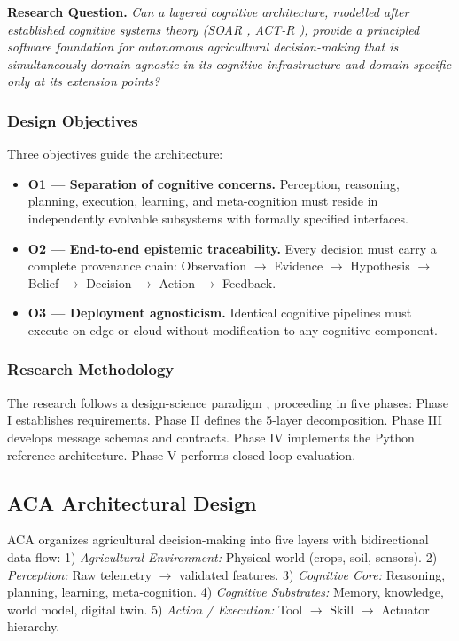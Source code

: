 \documentclass[journal, twocolumn]{IEEEtran}
\begin{document}
\textbf{Research Question.} \textit{Can a layered cognitive architecture, modelled after established cognitive systems theory (SOAR \cite{4}, ACT-R \cite{5}), provide a principled software foundation for autonomous agricultural decision-making that is simultaneously domain-agnostic in its cognitive infrastructure and domain-specific only at its extension points?}

\subsubsection{Design Objectives}
Three objectives guide the architecture:
\begin{itemize}
    \item \textbf{O1 — Separation of cognitive concerns.} Perception, reasoning, planning, execution, learning, and meta-cognition must reside in independently evolvable subsystems with formally specified interfaces.
    \item \textbf{O2 — End-to-end epistemic traceability.} Every decision must carry a complete provenance chain: Observation $\rightarrow$ Evidence $\rightarrow$ Hypothesis $\rightarrow$ Belief $\rightarrow$ Decision $\rightarrow$ Action $\rightarrow$ Feedback.
    \item \textbf{O3 — Deployment agnosticism.} Identical cognitive pipelines must execute on edge or cloud without modification to any cognitive component.
\end{itemize}

\subsubsection{Research Methodology}
The research follows a design-science paradigm \cite{6}, proceeding in five phases: Phase I establishes requirements. Phase II defines the 5-layer decomposition. Phase III develops message schemas and contracts. Phase IV implements the Python reference architecture. Phase V performs closed-loop evaluation.

\subsection{ACA Architectural Design}
ACA organizes agricultural decision-making into five layers with bidirectional data flow:
1) \textit{Agricultural Environment:} Physical world (crops, soil, sensors).
2) \textit{Perception:} Raw telemetry $\rightarrow$ validated features.
3) \textit{Cognitive Core:} Reasoning, planning, learning, meta-cognition.
4) \textit{Cognitive Substrates:} Memory, knowledge, world model, digital twin.
5) \textit{Action / Execution:} Tool $\rightarrow$ Skill $\rightarrow$ Actuator hierarchy.
\end{document}
